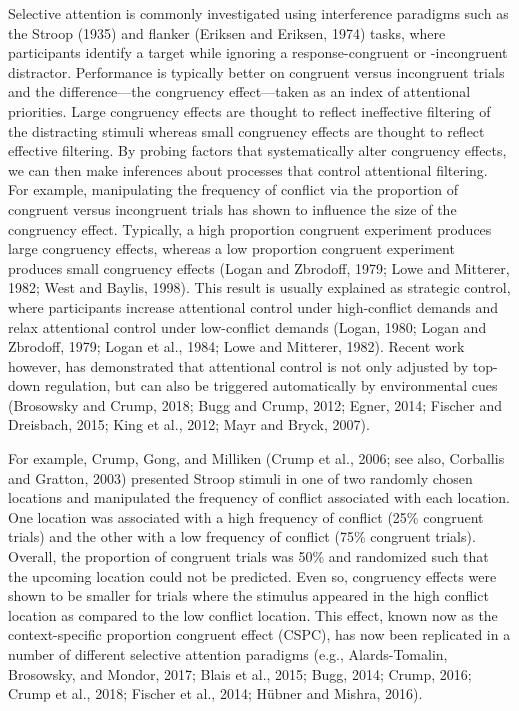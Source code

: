 \documentclass[]{DissertateCUNY}
\begin{document}
Selective attention is commonly investigated using interference
paradigms such as the Stroop (1935) and flanker (Eriksen and Eriksen,
1974) tasks, where participants identify a target while ignoring a
response-congruent or -incongruent distractor. Performance is typically
better on congruent versus incongruent trials and the difference---the
congruency effect---taken as an index of attentional priorities. Large
congruency effects are thought to reflect ineffective filtering of the
distracting stimuli whereas small congruency effects are thought to
reflect effective filtering. By probing factors that systematically
alter congruency effects, we can then make inferences about processes
that control attentional filtering. For example, manipulating the
frequency of conflict via the proportion of congruent versus incongruent
trials has shown to influence the size of the congruency effect.
Typically, a high proportion congruent experiment produces large
congruency effects, whereas a low proportion congruent experiment
produces small congruency effects (Logan and Zbrodoff, 1979; Lowe and
Mitterer, 1982; West and Baylis, 1998). This result is usually explained
as strategic control, where participants increase attentional control
under high-conflict demands and relax attentional control under
low-conflict demands (Logan, 1980; Logan and Zbrodoff, 1979; Logan et
al., 1984; Lowe and Mitterer, 1982). Recent work however, has
demonstrated that attentional control is not only adjusted by top-down
regulation, but can also be triggered automatically by environmental
cues (Brosowsky and Crump, 2018; Bugg and Crump, 2012; Egner, 2014;
Fischer and Dreisbach, 2015; King et al., 2012; Mayr and Bryck, 2007).

For example, Crump, Gong, and Milliken (Crump et al., 2006; see also,
Corballis and Gratton, 2003) presented Stroop stimuli in one of two
randomly chosen locations and manipulated the frequency of conflict
associated with each location. One location was associated with a high
frequency of conflict (25\% congruent trials) and the other with a low
frequency of conflict (75\% congruent trials). Overall, the proportion
of congruent trials was 50\% and randomized such that the upcoming
location could not be predicted. Even so, congruency effects were shown
to be smaller for trials where the stimulus appeared in the high
conflict location as compared to the low conflict location. This effect,
known now as the context-specific proportion congruent effect (CSPC),
has now been replicated in a number of different selective attention
paradigms (e.g., Alards-Tomalin, Brosowsky, and Mondor, 2017; Blais et
al., 2015; Bugg, 2014; Crump, 2016; Crump et al., 2018; Fischer et al.,
2014; Hübner and Mishra, 2016).
\end{document}
